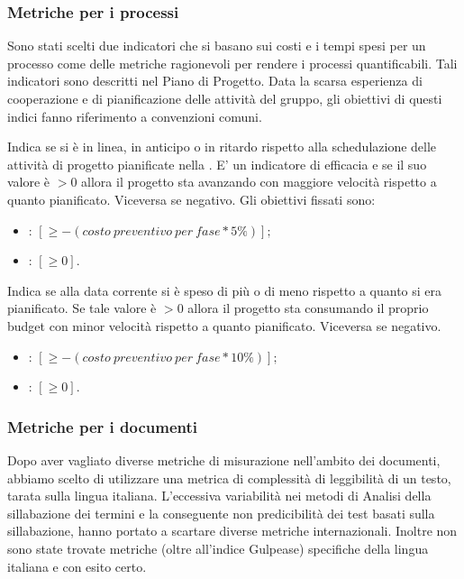 \subsubsection{Metriche per i processi} %
\label{4.3}
Sono stati scelti due indicatori che si basano sui costi e i tempi spesi per un processo come delle metriche ragionevoli per rendere i processi quantificabili. Tali indicatori sono descritti nel Piano di Progetto. Data la scarsa esperienza di cooperazione e di pianificazione delle attività del gruppo, gli obiettivi di questi indici fanno riferimento a convenzioni comuni.

\label{4.3.1}
Indica se si è in linea, in anticipo o in ritardo rispetto alla schedulazione delle attività di progetto pianificate nella . E' un indicatore di efficacia e se il suo valore è $> 0$ allora il progetto sta avanzando con maggiore velocità rispetto a quanto pianificato. Viceversa se negativo.
Gli obiettivi fissati sono:
\begin{itemize}
\item {}: $ [\geq -(costo\:preventivo\:per\:fase * 5\%)]; $
\item {}: $ [\geq 0]. $
\end{itemize}

\label{4.3.2}
Indica se alla data corrente si è speso di più o di meno rispetto a quanto si era pianificato. Se tale valore è $>0$ allora il progetto sta consumando il proprio budget con minor velocità rispetto a quanto pianificato. Viceversa se negativo.
\begin{itemize}
\item {}: $[\geq -(costo\:preventivo\:per\:fase * 10\%)];$
\item {}: $[\geq 0].$
\end{itemize}

\subsubsection{Metriche per i documenti}
\label{4.1}
Dopo aver vagliato diverse metriche di misurazione nell'ambito dei documenti, abbiamo scelto di utilizzare una metrica di complessità di leggibilità di un testo, tarata sulla lingua italiana. L'eccessiva variabilità nei metodi di Analisi della sillabazione dei termini e la conseguente non predicibilità dei test basati sulla sillabazione, hanno portato a scartare diverse metriche internazionali. Inoltre non sono state trovate metriche (oltre all'indice Gulpease) specifiche della lingua italiana e con esito certo.

